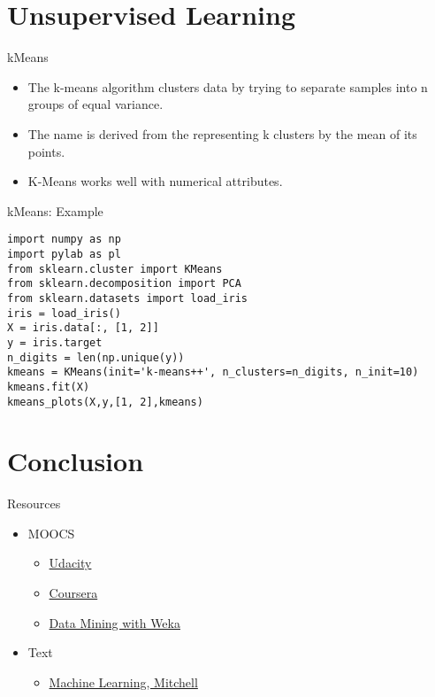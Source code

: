 \section{Unsupervised Learning}\label{unsupervised-learning}

\begin{frame}{kMeans}

\begin{itemize}
\itemsep1pt\parskip0pt
\item
  The k-means algorithm clusters data by trying to separate samples into
  n groups of equal variance.
\item
  The name is derived from the representing k clusters by the mean of
  its points.
\item
  K-Means works well with numerical attributes.
\end{itemize}

\end{frame}

\begin{frame}[fragile]{kMeans: Example}

\begin{verbatim}
import numpy as np
import pylab as pl
from sklearn.cluster import KMeans
from sklearn.decomposition import PCA
from sklearn.datasets import load_iris
iris = load_iris()
X = iris.data[:, [1, 2]]
y = iris.target
n_digits = len(np.unique(y))
kmeans = KMeans(init='k-means++', n_clusters=n_digits, n_init=10)
kmeans.fit(X)
kmeans_plots(X,y,[1, 2],kmeans)
\end{verbatim}

\end{frame}

\section{Conclusion}\label{conclusion}

\begin{frame}{Resources}

\begin{itemize}
\itemsep1pt\parskip0pt
\item
  MOOCS

  \begin{itemize}
  \itemsep1pt\parskip0pt
  \item
    \href{https://www.udacity.com/course/ud675}{Udacity}
  \item
    \href{https://www.coursera.org/course/ml}{Coursera}
  \item
    \href{https://weka.waikato.ac.nz/dataminingwithweka}{Data Mining
    with Weka}
  \end{itemize}
\item
  Text

  \begin{itemize}
  \itemsep1pt\parskip0pt
  \item
    \href{http://www.cs.cmu.edu/~tom/mlbook.html}{Machine Learning,
    Mitchell}
  \end{itemize}
\end{itemize}

\end{frame}

